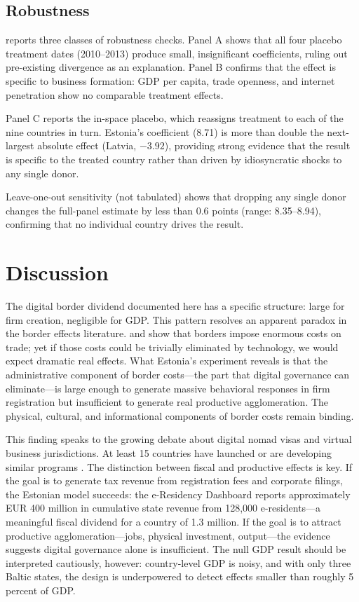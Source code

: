 \documentclass[12pt]{article}
\begin{document}
\subsection{Robustness}



 reports three classes of robustness checks. Panel A shows that all four placebo treatment dates (2010--2013) produce small, insignificant coefficients, ruling out pre-existing divergence as an explanation. Panel B confirms that the effect is specific to business formation: GDP per capita, trade openness, and internet penetration show no comparable treatment effects.

Panel C reports the in-space placebo, which reassigns treatment to each of the nine countries in turn. Estonia's coefficient (8.71) is more than double the next-largest absolute effect (Latvia, $-3.92$), providing strong evidence that the result is specific to the treated country rather than driven by idiosyncratic shocks to any single donor.

Leave-one-out sensitivity (not tabulated) shows that dropping any single donor changes the full-panel estimate by less than 0.6 points (range: 8.35--8.94), confirming that no individual country drives the result.

\section{Discussion}

The digital border dividend documented here has a specific structure: large for firm creation, negligible for GDP. This pattern resolves an apparent paradox in the border effects literature. \citet{mccallum1995} and \citet{andersonvanwincoop2003} show that borders impose enormous costs on trade; yet if those costs could be trivially eliminated by technology, we would expect dramatic real effects. What Estonia's experiment reveals is that the administrative component of border costs---the part that digital governance can eliminate---is large enough to generate massive behavioral responses in firm registration but insufficient to generate real productive agglomeration. The physical, cultural, and informational components of border costs remain binding.

This finding speaks to the growing debate about digital nomad visas and virtual business jurisdictions. At least 15 countries have launched or are developing similar programs \citep{oecd2020digital}. The distinction between fiscal and productive effects is key. If the goal is to generate tax revenue from registration fees and corporate filings, the Estonian model succeeds: the e-Residency Dashboard reports approximately EUR 400 million in cumulative state revenue from 128,000 e-residents---a meaningful fiscal dividend for a country of 1.3 million. If the goal is to attract productive agglomeration---jobs, physical investment, output---the evidence suggests digital governance alone is insufficient. The null GDP result should be interpreted cautiously, however: country-level GDP is noisy, and with only three Baltic states, the design is underpowered to detect effects smaller than roughly 5 percent of GDP.
\end{document}
